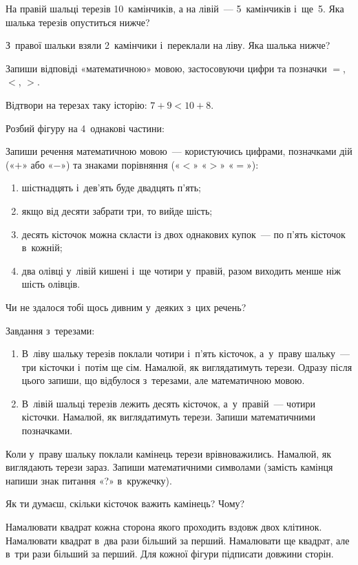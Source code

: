 \problem
На правій шальці терезів 10~камінчиків, а на лівій~--- 5~камінчиків і~ще~5.
Яка шалька терезів опуститься нижче?

З~правої шальки взяли 2~камінчики і~переклали на ліву.
Яка шалька нижче?

Запиши відповіді «математичною» мовою, застосовуючи цифри
та позначки $=$, $<$, $>$.


\problem
Відтвори на терезах таку історію: $7+9 < 10+8$.


\problem
Розбий фігуру на 4~однакові частини:


\problem
Запиши речення математичною мовою~--- користуючись цифрами,
позначками дій («$+$» або «$-$») та знаками порівняння («$<$» «$>$» «$=$»):
\begin{enumerate}
    \item шістнадцять і~дев'ять буде двадцять п'ять;
    \item якщо від десяти забрати три, то вийде шість;
    \item десять кісточок можна скласти із двох однакових купок~--- 
    по п'ять кісточок в~кожній;
    \item два олівці у~лівій кишені і~ще чотири у~правій,
    разом виходить менше ніж шість олівців.
\end{enumerate}
Чи не здалося тобі щось дивним у~деяких з~цих речень?

\problem
Завдання з~терезами:
\begin{enumerate}
    \item В~ліву шальку терезів поклали чотири і~п'ять кісточок,
    а~у~праву шальку~--- три кісточки і~потім ще сім.
    Намалюй, як виглядатимуть терези.
    Одразу після цього запиши, що відбулося з~терезами,
    але математичною мовою.
    \item В~лівій шальці терезів лежить десять кісточок,
    а~у~правій~--- чотири кісточки.
    Намалюй, як виглядатимуть терези. Запиши математичними позначками.
\end{enumerate}

Коли у~праву шальку поклали камінець терези врівноважились.
Намалюй, як виглядають терези зараз.
Запиши математичними символами
(замість камінця напиши знак питання «?» в~кружечку).

Як ти думаєш, скільки кісточок важить камінець? Чому?


\problem
Намалювати квадрат кожна сторона якого проходить вздовж двох клітинок.
Намалювати квадрат в~два рази більший за перший.
Намалювати ще квадрат, але в~три рази більший за перший.
Для кожної фігури підписати довжини сторін.


